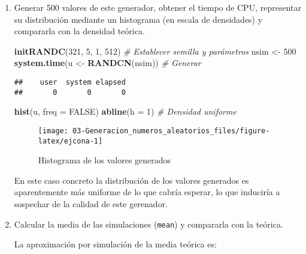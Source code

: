 \documentclass[
]{book}
\newenvironment{Shaded}{\begin{snugshade}}{\end{snugshade}}
\newcommand{\CommentTok}[1]{\textcolor[rgb]{0.56,0.35,0.01}{\textit{#1}}}
\newcommand{\DataTypeTok}[1]{\textcolor[rgb]{0.13,0.29,0.53}{#1}}
\newcommand{\DecValTok}[1]{\textcolor[rgb]{0.00,0.00,0.81}{#1}}
\newcommand{\KeywordTok}[1]{\textcolor[rgb]{0.13,0.29,0.53}{\textbf{#1}}}
\newcommand{\NormalTok}[1]{#1}
\newcommand{\OtherTok}[1]{\textcolor[rgb]{0.56,0.35,0.01}{#1}}
\newcommand{\StringTok}[1]{\textcolor[rgb]{0.31,0.60,0.02}{#1}}
\theoremstyle{break}
\theoremstyle{definition}
\theoremstyle{definition}
\theoremstyle{definition}
\theoremstyle{remark}
\begin{document}
\begin{enumerate}
\def\labelenumi{\alph{enumi})}
\item
  Generar 500 valores de este generador, obtener el tiempo de CPU,
  representar su distribución mediante un histograma (en escala
  de densidades) y compararla con la densidad teórica.

\begin{Shaded}
\begin{Highlighting}[]
\KeywordTok{initRANDC}\NormalTok{(}\DecValTok{321}\NormalTok{, }\DecValTok{5}\NormalTok{, }\DecValTok{1}\NormalTok{, }\DecValTok{512}\NormalTok{)       }\CommentTok{# Establecer semilla y parámetros}
\NormalTok{nsim <-}\StringTok{ }\DecValTok{500}
\KeywordTok{system.time}\NormalTok{(u <-}\StringTok{ }\KeywordTok{RANDCN}\NormalTok{(nsim))  }\CommentTok{# Generar}
\end{Highlighting}
\end{Shaded}

\begin{verbatim}
##    user  system elapsed 
##       0       0       0
\end{verbatim}

\begin{Shaded}
\begin{Highlighting}[]
\KeywordTok{hist}\NormalTok{(u, }\DataTypeTok{freq =} \OtherTok{FALSE}\NormalTok{)}
\KeywordTok{abline}\NormalTok{(}\DataTypeTok{h =} \DecValTok{1}\NormalTok{)                   }\CommentTok{# Densidad uniforme}
\end{Highlighting}
\end{Shaded}

  \begin{figure}[!htb]

  {\centering \texttt{[image: 03-Generacion\_numeros\_aleatorios\_files/figure-latex/ejcona-1]} 

  }

  \caption{Histograma de los valores generados}\label{fig:ejcona}
  \end{figure}

  En este caso concreto la distribución de los valores generados es aparentemente más uniforme de lo que cabría esperar, lo que induciría a sospechar de la calidad de este gerenador.
\item
  Calcular la media de las simulaciones (\texttt{mean}) y compararla con
  la teórica.

  La aproximación por simulación de la media teórica es:


\end{enumerate}
\end{document}
